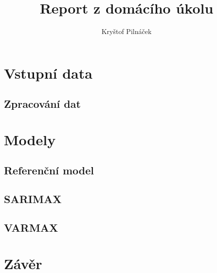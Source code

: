\documentclass[]{article}
\title{Report z domácího úkolu}
\author{Kryštof Pilnáček}
\begin{document}
\maketitle

\clearpage

\section{Vstupní data}

\subsection{Zpracování dat}

\clearpage

\section{Modely}

\subsection{Referenční model}

\subsection{SARIMAX}

\subsection{VARMAX}

\clearpage

\section{Závěr}
\end{document}
